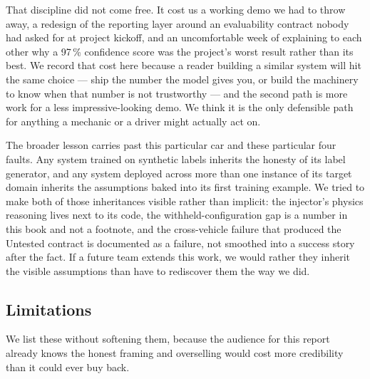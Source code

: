 That discipline did not come free. It cost us a working demo we had to
throw away, a redesign of the reporting layer around an evaluability
contract nobody had asked for at project kickoff, and an uncomfortable
week of explaining to each other why a 97\,\% confidence score was the
project's worst result rather than its best. We record that cost here
because a reader building a similar system will hit the same choice ---
ship the number the model gives you, or build the machinery to know when
that number is not trustworthy --- and the second path is more work for a
less impressive-looking demo. We think it is the only defensible path for
anything a mechanic or a driver might actually act on.

The broader lesson carries past this particular car and these particular
four faults. Any system trained on synthetic labels inherits the honesty
of its label generator, and any system deployed across more than one
instance of its target domain inherits the assumptions baked into its
first training example. We tried to make both of those inheritances
visible rather than implicit: the injector's physics reasoning lives next
to its code, the withheld-configuration gap is a number in this book and
not a footnote, and the cross-vehicle failure that produced the Untested
contract is documented as a failure, not smoothed into a success story
after the fact. If a future team extends this work, we would rather they
inherit the visible assumptions than have to rediscover them the way we
did.

\subsection{Limitations}

We list these without softening them, because the audience for this report
already knows the honest framing and overselling would cost more credibility
than it could ever buy back.

